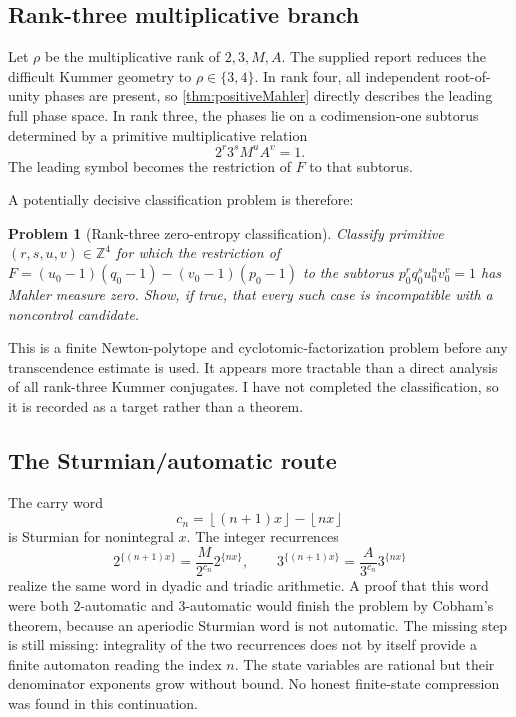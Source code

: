 \documentclass[11pt]{article}
\newtheorem{problem}[theorem]{Problem}
\theoremstyle{definition}
\theoremstyle{remark}
\newcommand{\Z}{\mathbb Z}
\newcommand{\floor}[1]{\left\lfloor#1\right\rfloor}
\begin{document}
\subsection{Rank-three multiplicative branch}

Let $\rho$ be the multiplicative rank of $2,3,M,A$.  The supplied report reduces
the difficult Kummer geometry to $\rho\in\{3,4\}$.  In rank four, all independent
root-of-unity phases are present, so \cref{thm:positiveMahler} directly describes
the leading full phase space.  In rank three, the phases lie on a codimension-one
subtorus determined by a primitive multiplicative relation
\begin{equation}\label{eq:rank3relation}
 2^r3^sM^uA^v=1.
\end{equation}
The leading symbol becomes the restriction of $F$ to that subtorus.

A potentially decisive classification problem is therefore:

\begin{problem}[Rank-three zero-entropy classification]\label{prob:rank3entropy}
Classify primitive $(r,s,u,v)\in\Z^4$ for which the restriction of
$F=(u_0-1)(q_0-1)-(v_0-1)(p_0-1)$ to the subtorus
$p_0^rq_0^su_0^uv_0^v=1$ has Mahler measure zero.  Show, if true, that every such
case is incompatible with a noncontrol candidate.
\end{problem}

This is a finite Newton-polytope and cyclotomic-factorization problem before any
transcendence estimate is used.  It appears more tractable than a direct analysis
of all rank-three Kummer conjugates.  I have not completed the classification,
so it is recorded as a target rather than a theorem.

\subsection{The Sturmian/automatic route}

The carry word
\begin{equation}\label{eq:carry}
 c_n=\floor{(n+1)x}-\floor{nx}
\end{equation}
is Sturmian for nonintegral $x$.  The integer recurrences
\[
 2^{\{(n+1)x\}}=\frac{M}{2^{c_n}}2^{\{nx\}},
 \qquad
 3^{\{(n+1)x\}}=\frac{A}{3^{c_n}}3^{\{nx\}}
\]
realize the same word in dyadic and triadic arithmetic.  A proof that this word
were both $2$-automatic and $3$-automatic would finish the problem by Cobham's
theorem, because an aperiodic Sturmian word is not automatic.  The missing step
is still missing: integrality of the two recurrences does not by itself provide
a finite automaton reading the index $n$.  The state variables are rational but
their denominator exponents grow without bound.  No honest finite-state
compression was found in this continuation.
\end{document}
